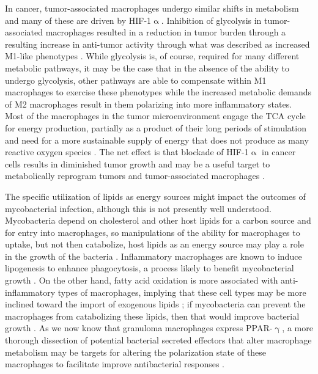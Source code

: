 In cancer, tumor\hyp{}associated macrophages undergo similar shifts in metabolism and many of these are driven by HIF\hyp{}1$\upalpha$. Inhibition of glycolysis in tumor\hyp{}associated macrophages resulted in a reduction in tumor burden through a resulting increase in anti\hyp{}tumor activity through what was described as increased M1\hyp{}like phenotypes \citep{Mehla2019, Rabold2017}. While glycolysis is, of course, required for many different metabolic pathways, it may be the case that in the absence of the ability to undergo glycolysis, other pathways are able to compensate within M1 macrophages to exercise these phenotypes while the increased metabolic demands of M2 macrophages result in them polarizing into more inflammatory states. Most of the macrophages in the tumor microenvironment engage the TCA cycle for energy production, partially as a product of their long periods of stimulation and need for a more sustainable supply of energy that does not produce as many reactive oxygen species \citep{Yu2020}. The net effect is that blockade of HIF\hyp{}1$\upalpha$ in cancer cells results in diminished tumor growth and may be a useful target to metabolically reprogram tumors and tumor\hyp{}associated macrophages \citep{Hong2004}.

The specific utilization of lipids as energy sources might impact the outcomes of mycobacterial infection, although this is not presently well understood. Mycobacteria depend on cholesterol and other host lipids for a carbon source and for entry into macrophages, so manipulations of the ability for macrophages to uptake, but not then catabolize, host lipids as an energy source may play a role in the growth of the bacteria \citep{Gatfield2000}. Inflammatory macrophages are known to induce lipogenesis to enhance phagocytosis, a process likely to benefit mycobacterial growth \citep{Yan2020}. On the other hand, fatty acid oxidation is more associated with anti\hyp{}inflammatory types of macrophages, implying that these cell types may be more inclined toward the import of exogenous lipids \citep{Yan2020}; if mycobacteria can prevent the macrophages from catabolizing these lipids, then that would improve bacterial growth \citep{Nazarova2019}. As we now know that granuloma macrophages express PPAR\hyp{}$\upgamma$, a more thorough dissection of potential bacterial secreted effectors that alter macrophage metabolism may be targets for altering the polarization state of these macrophages to facilitate improve antibacterial responses \citep{Phan2017, Gideon2022, Cronan2021, Chawla2001, Wilson2019}. 

